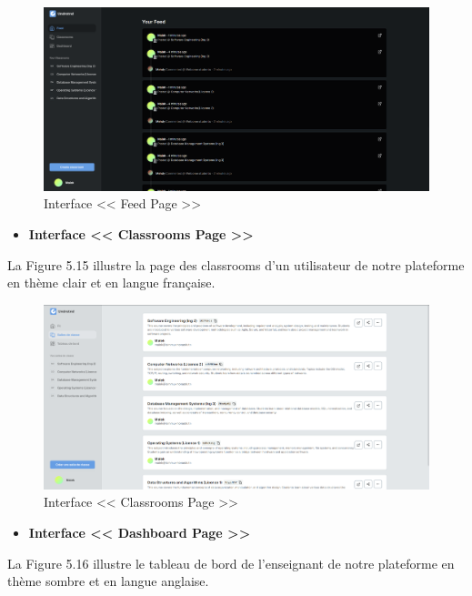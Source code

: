 \begin{figure}[H]
    \centering
    \includegraphics[width=1.1\textwidth,height=0.5\textwidth]{images/chp5/fig14.png}
    \caption{Interface << Feed Page >>}
    \label{Interface << Feed Page >>}    
\end{figure}
\begin{itemize}
    \item \textbf{Interface << Classrooms Page >>}
\end{itemize}
La Figure 5.15 illustre la page des classrooms d'un utilisateur de notre plateforme en thème clair et en langue française.
\begin{figure}[H]
    \centering
    \includegraphics[width=1.1\textwidth,height=0.5\textwidth]{images/chp5/fig15.png}
    \caption{Interface << Classrooms Page >>}
    \label{Interface << Classrooms Page >>}    
\end{figure}
\begin{itemize}
    \item \textbf{Interface << Dashboard Page >>}
\end{itemize}
La Figure 5.16 illustre le tableau de bord de l'enseignant de notre plateforme en thème sombre et en langue anglaise.
